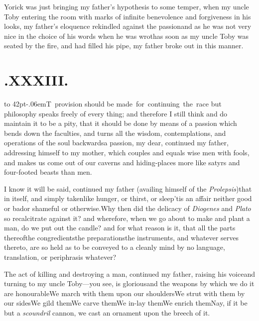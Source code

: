 \documentclass{article}
\begin{document}
Yorick was just bringing my father’s hypothesis to
some temper, when my uncle Toby entering the room with marks\pb
of infinite benevolence and forgiveness in his looks, my
father’s eloquence re\-kindled against the
passion\tsh and as he was not very nice in the choice of
his words when he was wroth\tsh as soon as my uncle
Toby was seated by the fire, and had filled his pipe, my
father broke out in this manner.

\newpage
\section{.\enspace XXXIII.}

\lettrine{\hbox to 42pt{\kern -.06em\Tsk T}}{\,} provision should
be\break
\hbox{made for continuing the race}
but philosophy speaks freely of every thing; and therefore I still think and do
maintain it to be a pity, that it should be done by means of a
passion which bends down the faculties, and turns all the wisdom,
contemplations, and opera\-tions of the soul backwards\tsh a
passion, my dear, continued my father, addressing himself to my
mother, which couples and equals wise men with fools, and makes us
come out of our caverns and hiding-places more like satyrs and
four-footed beasts than men.

\newpage
I know it will be said, continued my father (availing himself of
the \textit{Prolepsis})\break that in itself, and simply
taken\tsh like hunger, or thirst, or
sleep\tsh ’tis an affair neither good or
bad\tsk or shameful or 
otherwise.\tsh Why then did the delicacy
of \textit{Diogenes} and \textit{Plato} so recalcitrate against
it? and wherefore, when we go about to make and plant a
man, do we put out the candle? and for what reason is it, that all
the parts thereof\tsk the congredients\tsk the
preparations\tsk the instruments, and whatever serves thereto,
are so held as to be conveyed to a cleanly mind by no language,
translation, or periphrasis whatever?

\tsh The act of killing and destroying a man, continued
my father, raising his voice\tsk and turning to my uncle
Toby—\pb you see, is glorious\tsk and the weapons by
which we do it are honourable\tsh We march with them upon
our shoulders\tsk\break We strut with them by our
sides\tsh We gild them\tsh We carve
them\tsh We in-lay them\tsh We enrich
them\tsh\break Nay, if it be but a \textit{scoundril} cannon, we
cast an ornament upon the breech of it.\tsk
\end{document}
